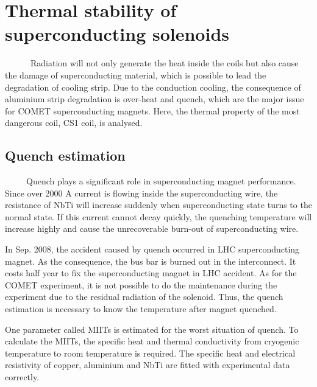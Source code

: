 \chapter{Thermal stability of superconducting solenoids}
~~~~~~Radiation will not only generate the heat inside the coils but also cause the damage of superconducting material, which is possible to lead the degradation of cooling strip.
Due to the conduction cooling, the consequence of aluminium strip degradation is over-heat and quench, which are the major issue for COMET superconducting magnets.
Here, the thermal property of the most dangerous coil, CS1 coil, is analysed.

\section{Quench estimation}
~~~~~Quench plays a significant role in superconducting magnet performance.
Since over 2000 A current is flowing inside the superconducting wire, the resistance of NbTi will increase suddenly when superconducting state turns to the normal state.
If this current cannot decay quickly, the quenching temperature will increase highly and cause the unrecoverable burn-out of superconducting wire.

In Sep. 2008, the accident caused by quench occurred in LHC superconducting magnet.
As the consequence, the bus bar is burned out in the interconnect.
It costs half year to fix the superconducting magnet in LHC accident.
As for the COMET experiment, it is not possible to do the maintenance during the experiment due to the residual radiation of the solenoid.
Thus, the quench estimation is necessary to know the temperature after magnet quenched.

One parameter called MIITs is estimated for the worst situation of quench.
To calculate the MIITs, the specific heat and thermal conductivity from cryogenic temperature to room temperature is required.
The specific heat and electrical resistivity of copper, aluminium and NbTi are fitted with experimental data correctly.

